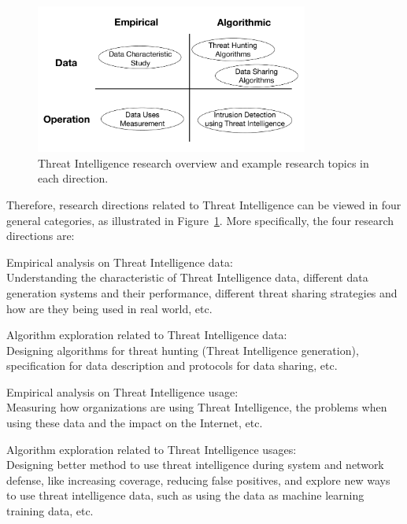 \begin{dissertationintroduction}
\begin{figure}
\centering
\includegraphics[width=0.8\textwidth]{threat_intel_research_overview.pdf}
\caption{Threat Intelligence research overview and example research
topics in each direction.}
\label{fig:threat_intel_overview}
\end{figure}

Therefore, research directions related to Threat Intelligence can be 
viewed in four general categories, as illustrated in
Figure~\ref{fig:threat_intel_overview}. More specifically, the four 
research directions are: 
\begin{prettylist}
    \item Empirical analysis on Threat Intelligence data: \\
    Understanding the characteristic of Threat Intelligence data, different
    data generation systems and their performance, different threat sharing
    strategies and how are they being used in real world, etc.
    
    \item Algorithm exploration related to Threat Intelligence data: \\
    Designing algorithms for threat hunting (Threat Intelligence generation),
    specification for data description and protocols for data sharing, etc.
    
    \item Empirical analysis on Threat Intelligence usage: \\
    Measuring how organizations are using Threat Intelligence, the problems 
    when using these data and the impact on the Internet, etc.
    
    \item Algorithm exploration related to Threat Intelligence usages: \\
    Designing better method to use threat intelligence during system and 
    network defense, like increasing coverage, reducing false positives, and
    explore new ways to use threat intelligence data, such as using the 
    data as machine learning training data, etc.
\end{prettylist}


\end{dissertationintroduction}
